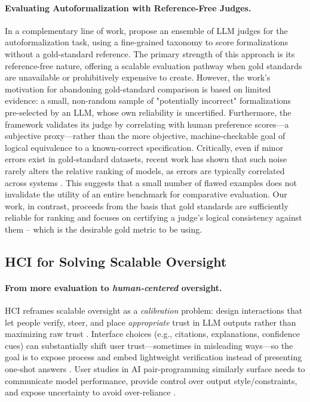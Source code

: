 \documentclass{article}
\begin{document}
\paragraph{Evaluating Autoformalization with Reference-Free Judges.}
In a complementary line of work, \citet{zhang2025goldstandardsepistemicensemble} propose an ensemble of LLM judges for the autoformalization task, using a fine-grained taxonomy to score formalizations without a gold-standard reference.
The primary strength of this approach is its reference-free nature, offering a scalable evaluation pathway when gold standards are unavailable or prohibitively expensive to create.
However, the work's motivation for abandoning gold-standard comparison is based on limited evidence: a small, non-random sample of "potentially incorrect" formalizations pre-selected by an LLM, whose own reliability is uncertified.
Furthermore, the framework validates its judge by correlating with human preference scores—a subjective proxy—rather than the more objective, machine-checkable goal of logical equivalence to a known-correct specification.
Critically, even if minor errors exist in gold-standard datasets, recent work has shown that such noise rarely alters the relative ranking of models, as errors are typically correlated across systems \citep{salaudeen2024imagenot}.
This suggests that a small number of flawed examples does not invalidate the utility of an entire benchmark for comparative evaluation.
Our work, in contrast, proceeds from the basis that gold standards are sufficiently reliable for ranking and focuses on certifying a judge's logical consistency against them -- which is the desirable gold metric to be using.

\subsection{HCI for Solving Scalable Oversight}

\paragraph{From more evaluation to \emph{human-centered} oversight.}
HCI reframes scalable oversight as a \emph{calibration} problem: design interactions that let people verify, steer, and place \emph{appropriate} trust in LLM outputs rather than maximizing raw trust \citep{bach2022trusthci}. Interface choices (e.g., citations, explanations, confidence cues) can substantially shift user trust---sometimes in misleading ways---so the goal is to expose process and embed lightweight verification instead of presenting one-shot answers \citep{ding2025citations}. User studies in AI pair-programming similarly surface needs to communicate model performance, provide control over output style/constraints, and expose uncertainty to avoid over-reliance \citep{wang2024trustcode}.%
\end{document}
